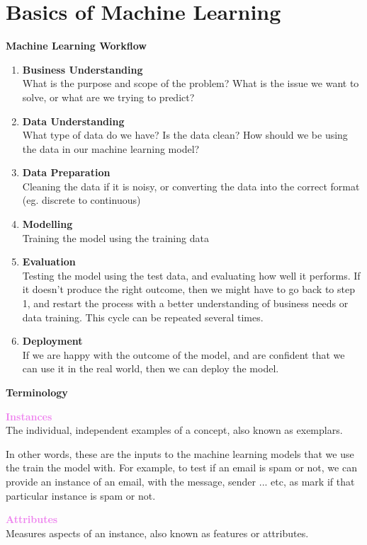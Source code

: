 \documentclass[a4paper,10pt]{article}
\begin{document}
\section*{Basics of Machine Learning}
\textcolor{Periwinkle}{\textbf{Machine Learning Workflow}}
\begin{enumerate}
	\item \textbf{Business Understanding} \\
	What is the purpose and scope of the problem? What is the issue we want to solve, or what are we trying to predict? 
	\item \textbf{Data Understanding} \\
	What type of data do we have? Is the data clean? How should we be using the data in our machine learning model? 
	\item \textbf{Data Preparation}\\
	Cleaning the data if it is noisy, or converting the data into the correct format (eg. discrete to continuous)
	\item \textbf{Modelling} \\
	Training the model using the training data
	\item \textbf{Evaluation} \\
	Testing the model using the test data, and evaluating how well it performs. If it doesn't produce the right outcome, then we might have to go back to step 1, and restart the process with a better understanding of business needs or data training. This cycle can be repeated several times. 
	\item \textbf{Deployment}\\
	If we are happy with the outcome of the model, and are confident that we can use it in the real world, then we can deploy the model. 
\end{enumerate}
\textcolor{Periwinkle}{\textbf{Terminology}}
\begin{shaded}
	\noindent \textcolor{Violet}{\textbf{Instances}}\\
	The individual, independent examples of a concept, also known as exemplars. 
\end{shaded}
\noindent In other words, these are the inputs to the machine learning models that we use the train the model with. For example, to test if an email is spam or not, we can provide an instance of an email, with the message, sender ... etc, as mark if that particular instance is spam or not.
\begin{shaded}
	\noindent \textcolor{Violet}{\textbf{Attributes}} \\
	Measures aspects of an instance, also known as features or attributes.
\end{shaded}
\end{document}
